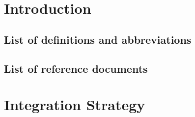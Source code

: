 \documentclass{../Common/Structure/doc_pdf}
\begin{document}
\titleToc
\newcommand{\testCase}[7]{%
	\unbreakableBlock{%
		\vspace{0.5em}
		\paragraphnewline{Test Case I#1}
		\newline
		\begin{tabulary}{\linewidth}{Y{3cm}|X{8.25cm}}
			\textbf{Test Item(s)} & #2 $\longleftrightarrow$ #3 \\ \hline
			\textbf{Input Specification} & #4 \\ \hline
			\textbf{Output Specification} & #5 \\ \hline
			\textbf{Environmental Needs} & #6 \\ \hline
			\textbf{Target} & #7 \\
		\end{tabulary}
		\vspace{0.5em}%
	}%
}

\newcommand{\testCaseSub}[7]{%
	\unbreakableBlock{%
		\vspace{0.5em}
		\paragraphnewline{Test Case T#1}
		\newline
		\begin{tabulary}{\linewidth}{Y{3cm}|X{8.25cm}}
			\textbf{Test Item(s)} & #2 $\longleftrightarrow$ #3 \\ \hline
			\textbf{Input Specification} & #4 \\ \hline
			\textbf{Output Specification} & #5 \\ \hline
			\textbf{Environmental Needs} & #6 \\ \hline
			\textbf{Target} & #7 \\
		\end{tabulary}
		\vspace{0.5em}%
	}%
}
\chapter{Introduction}

\section{List of definitions and abbreviations}

\section{List of reference documents}

\newpage

\chapter{Integration Strategy}
\end{document}
